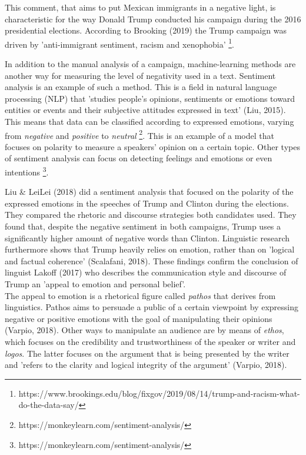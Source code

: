 \documentclass[a4paper,pdf]{article} %
\begin{document}
This comment, that aims to put Mexican immigrants in a negative light, is characteristic for the way Donald Trump conducted his campaign during the 2016 presidential elections. According to Brooking (2019) the Trump campaign was driven by 'anti-immigrant sentiment, racism and xenophobia' \footnote{https://www.brookings.edu/blog/fixgov/2019/08/14/trump-and-racism-what-do-the-data-say/}. 

In addition to the manual analysis of a campaign, machine-learning methods are another way for measuring the level of negativity used in a text. Sentiment analysis is an example of such a method. This is a field in natural language processing (NLP) that 'studies people's opinions, sentiments or emotions toward entities or events and their subjective attitudes expressed in text' (Liu, 2015). This means that data can be classified according to expressed emotions, varying from \emph{negative} and \emph{positive} to \emph{neutral}  \footnote{https://monkeylearn.com/sentiment-analysis/}. This is an example of a model that focuses on polarity to measure a speakers' opinion on a certain topic. Other types of sentiment analysis can focus on detecting feelings and emotions or even intentions \footnote{https://monkeylearn.com/sentiment-analysis/}.

Liu \& LeiLei (2018) did a sentiment analysis that focused on the polarity of the expressed emotions in the speeches of Trump and Clinton during the elections. They compared the rhetoric and discourse strategies both candidates used. They found that, despite the negative sentiment in both campaigns, Trump uses a significantly higher amount of negative words than Clinton. Linguistic research furthermore shows that Trump heavily relies on emotion, rather than on 'logical and factual coherence' (Scalafani, 2018). These findings confirm the conclusion of linguist Lakoff (2017) who describes the communication style and discourse of Trump an 'appeal to emotion and personal belief'. \\

The appeal to emotion is a rhetorical figure called \emph{pathos} that derives from linguistics. Pathos aims to persuade a public of a certain viewpoint by expressing negative or positive emotions with the goal of manipulating their opinions (Varpio, 2018). Other ways to manipulate an audience are by means of \emph{ethos}, which focuses on the credibility and trustworthiness of the speaker or writer and \emph{logos}. The latter focuses on the argument that is being presented by the writer and 'refers to the clarity and logical integrity of the argument' (Varpio, 2018). \\
\end{document}

